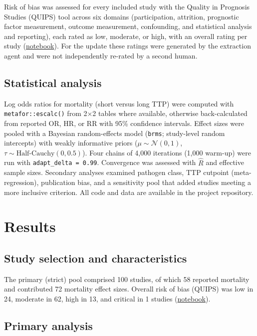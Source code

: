 \documentclass[
  11pt,
]{article}
\begin{document}
Risk of bias was assessed for every included study with the Quality in
Prognosis Studies (QUIPS) tool across six domains (participation,
attrition, prognostic factor measurement, outcome measurement,
confounding, and statistical analysis and reporting), each rated as low,
moderate, or high, with an overall rating per study
(\href{notebooks/rob.qmd}{notebook}). For the update these ratings were
generated by the extraction agent and were not independently re-rated by
a second human.

\subsection{Statistical analysis}\label{statistical-analysis}

Log odds ratios for mortality (short versus long TTP) were computed with
\texttt{metafor::escalc()} from 2×2 tables where available, otherwise
back-calculated from reported OR, HR, or RR with 95\% confidence
intervals. Effect sizes were pooled with a Bayesian random-effects model
(\texttt{brms}; study-level random intercepts) with weakly informative
priors (\(\mu \sim \mathcal{N}(0,1)\),
\(\tau \sim \text{Half-Cauchy}(0, 0.5)\)). Four chains of 4,000
iterations (1,000 warm-up) were run with \texttt{adapt\_delta\ =\ 0.99}.
Convergence was assessed with \(\hat{R}\) and effective sample sizes.
Secondary analyses examined pathogen class, TTP cutpoint
(meta-regression), publication bias, and a sensitivity pool that added
studies meeting a more inclusive criterion. All code and data are
available in the project repository.

\section{Results}\label{results}

\subsection{Study selection and
characteristics}\label{study-selection-and-characteristics}

The primary (strict) pool comprised 100 studies, of which 58 reported
mortality and contributed 72 mortality effect sizes. Overall risk of
bias (QUIPS) was low in 24, moderate in 62, high in 13, and critical in
1 studies (\href{notebooks/rob.qmd}{notebook}).

\subsection{Primary analysis}\label{primary-analysis}
\end{document}
